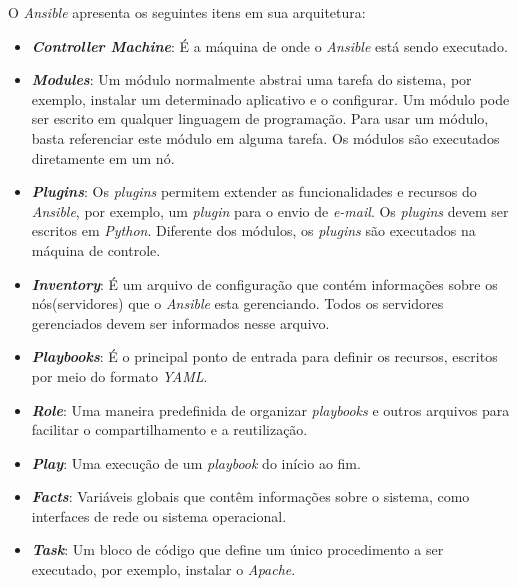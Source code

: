  O \textit{Ansible} apresenta os seguintes itens em sua arquitetura:

\hfill
 \begin{itemize}
\item \textbf{\textit{Controller Machine}}: É a máquina de onde o \textit{Ansible} está sendo executado. 

\item \textbf{\textit{Modules}}: Um módulo normalmente abstrai uma tarefa do sistema, por exemplo, instalar um determinado aplicativo e o configurar. Um módulo pode ser escrito em qualquer linguagem de programação. Para usar um módulo, basta referenciar este módulo em alguma tarefa. Os módulos são executados diretamente em um nó.   

\item \textbf{\textit{Plugins}}: Os \textit{plugins} permitem extender as funcionalidades e recursos do \textit{Ansible}, por exemplo, um \textit{plugin} para o envio de \textit{e-mail}. Os \textit{plugins} devem ser escritos em \textit{Python}. Diferente dos módulos, os \textit{plugins} são executados na máquina de controle.

\item \textbf{\textit{Inventory}}: É um arquivo de configuração que contém informações sobre os nós(servidores) que o \textit{Ansible} esta gerenciando. Todos os servidores gerenciados devem ser informados nesse arquivo.

\item \textbf{\textit{Playbooks}}: É o principal ponto de entrada para definir os recursos, escritos por meio do formato \textit{YAML}.

\item \textbf{\textit{Role}}: Uma maneira predefinida de organizar \textit{playbooks} e outros arquivos para facilitar o compartilhamento e a reutilização.

\item \textbf{\textit{Play}}: Uma execução de um \textit{playbook} do início ao fim.

\item \textbf{\textit{Facts}}: Variáveis globais que contêm informações sobre o sistema, como interfaces de rede ou sistema operacional.

\item \textbf{\textit{Task}}: Um bloco de código que define um único procedimento a ser executado, por exemplo, instalar o \textit{Apache}.
 \end{itemize}
